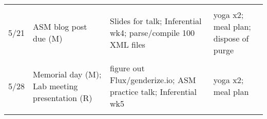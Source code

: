 \documentclass[]{article}
\begin{document}
\begin{longtable}[]{@{}clll@{}}
\begin{minipage}[t]{0.33\columnwidth}
\strut
\end{minipage} & \begin{minipage}[t]{0.28\columnwidth}\raggedright\strut
\strut
\end{minipage}\tabularnewline
\begin{minipage}[t]{0.04\columnwidth}\centering\strut
5/21\strut
\end{minipage} & \begin{minipage}[t]{0.24\columnwidth}\raggedright\strut
ASM blog post due (M)\strut
\end{minipage} & \begin{minipage}[t]{0.33\columnwidth}\raggedright\strut
Slides for talk; Inferential wk4; parse/compile 100 XML files\strut
\end{minipage} & \begin{minipage}[t]{0.28\columnwidth}\raggedright\strut
yoga x2; meal plan; dispose of purge\strut
\end{minipage}\tabularnewline
\begin{minipage}[t]{0.04\columnwidth}\centering\strut
\strut
\end{minipage} & \begin{minipage}[t]{0.24\columnwidth}\raggedright\strut
\strut
\end{minipage} & \begin{minipage}[t]{0.33\columnwidth}\raggedright\strut
\strut
\end{minipage} & \begin{minipage}[t]{0.28\columnwidth}\raggedright\strut
\strut
\end{minipage}\tabularnewline
\begin{minipage}[t]{0.04\columnwidth}\centering\strut
5/28\strut
\end{minipage} & \begin{minipage}[t]{0.24\columnwidth}\raggedright\strut
Memorial day (M); Lab meeting presentation (R)\strut
\end{minipage} & \begin{minipage}[t]{0.33\columnwidth}\raggedright\strut
figure out Flux/genderize.io; ASM practice talk; Inferential wk5\strut
\end{minipage} & \begin{minipage}[t]{0.28\columnwidth}\raggedright\strut
yoga x2; meal plan\strut
\end{minipage}\tabularnewline
\begin{minipage}[t]{0.04\columnwidth}\centering\strut
\strut
\end{minipage} & \begin{minipage}[t]{0.24\columnwidth}\raggedright\strut

\end{minipage}
\end{longtable}
\end{document}
